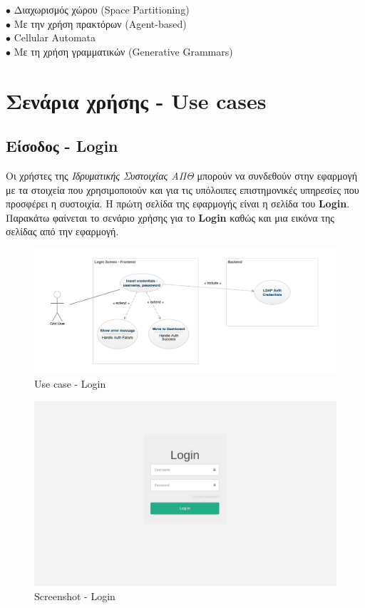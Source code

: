 \begin{description}
  \item[$\bullet$ Διαχωρισμός χώρου (Space Partitioning)] 
  \item[$\bullet$ Με την χρήση πρακτόρων (Agent-based)]
    \item[$\bullet$ Cellular Automata] 
    \item[$\bullet$ Με τη χρήση γραμματικών (Generative Grammars)] 
\end{description}

\section{Σενάρια χρήσης - Use cases}

\subsection{Είσοδος - Login}

Οι χρήστες της \textit{Ιδρυματικής Συστοιχίας ΑΠΘ} μπορούν να συνδεθούν στην εφαρμογή με τα στοιχεία που χρησιμοποιούν και για τις υπόλοιπες επιστημονικές υπηρεσίες που προσφέρει η συστοιχία. Η πρώτη σελίδα της εφαρμογής είναι η σελίδα του \textbf{Login}. Παρακάτω φαίνεται το σενάριο χρήσης για το \textbf{Login} καθώς και μια εικόνα της σελίδας από την εφαρμογή.

\begin{figure}[t]
\caption{Use case - Login}
\includegraphics[width=16cm]{../images/login-use-case.png}
\centering
\end{figure}
\clearpage

\begin{figure}[t]
\caption{Screenshot - Login}
\includegraphics[width=16cm]{../images/login-screenshot.png}
\centering
\end{figure}
\clearpage

